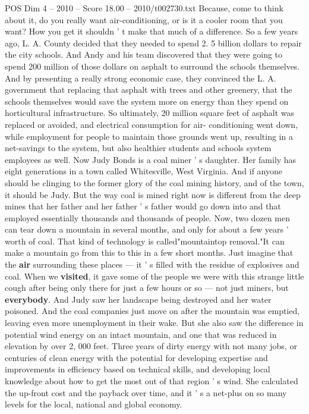 \begin{textsample}{POS Dim 4 – 2010 – Score 18.00 – 2010/t002730.txt}
Because, come to think about it, do you really want air-conditioning, or is it a cooler room that you want?
How you get it shouldn ' t make that much of a difference.
So a few years ago, L.
A.
County decided that they needed to spend 2. 5 billion dollars to repair the city schools.
And Andy and his team discovered that they were going to spend 200 million of those dollars on asphalt to surround the schools themselves.
And by presenting a really strong economic case, they convinced the L.
A. government that replacing that asphalt with trees and other greenery, that the schools themselves would save the system more on energy than they spend on horticultural infrastructure.
So ultimately, 20 million square feet of asphalt was replaced or avoided, and electrical consumption for air- conditioning went down, while employment for people to maintain those grounds went up, resulting in a net-savings to the system, but also healthier students and schools system employees as well.
Now Judy Bonds is a coal miner ' s daughter.
Her family has eight generations in a town called Whitesville, West Virginia.
And if anyone should be clinging to the former glory of the coal mining history, and of the town, it should be Judy.
But the way coal is mined right now is different from the deep mines that her father and her father ' s father would go down into and that employed essentially thousands and thousands of people.
Now, two dozen men can tear down a mountain in several months, and only for about a few years ' worth of coal.
That kind of technology is called"mountaintop removal."It can make a mountain go from this to this in a few short months.
Just imagine that the \textbf{air} surrounding these places — it ' s filled with the residue of explosives and coal.
When we \textbf{visited}, it gave some of the people we were with this strange little cough after being only there for just a few hours or so — not just miners, but \textbf{everybody}.
And Judy saw her landscape being destroyed and her water poisoned.
And the coal companies just move on after the mountain was emptied, leaving even more unemployment in their wake.
But she also saw the difference in potential wind energy on an intact mountain, and one that was reduced in elevation by over 2, 000 feet.
Three years of dirty energy with not many jobs, or centuries of clean energy with the potential for developing expertise and improvements in efficiency based on technical skills, and developing local knowledge about how to get the most out of that region ' s wind.
She calculated the up-front cost and the payback over time, and it ' s a net-plus on so many levels for the local, national and global economy.

\end{textsample}
